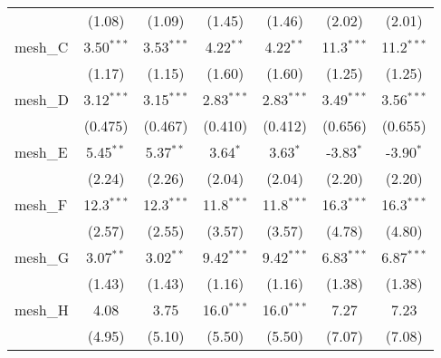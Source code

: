 \begin{tabular}{lcccccc}
                                                               & (1.08)         & (1.09)        & (1.45)        & (1.46)        & (2.02)        & (2.01)\\   
   mesh\_C                                                     & 3.50$^{***}$   & 3.53$^{***}$  & 4.22$^{**}$   & 4.22$^{**}$   & 11.3$^{***}$  & 11.2$^{***}$\\   
                                                               & (1.17)         & (1.15)        & (1.60)        & (1.60)        & (1.25)        & (1.25)\\   
   mesh\_D                                                     & 3.12$^{***}$   & 3.15$^{***}$  & 2.83$^{***}$  & 2.83$^{***}$  & 3.49$^{***}$  & 3.56$^{***}$\\   
                                                               & (0.475)        & (0.467)       & (0.410)       & (0.412)       & (0.656)       & (0.655)\\   
   mesh\_E                                                     & 5.45$^{**}$    & 5.37$^{**}$   & 3.64$^{*}$    & 3.63$^{*}$    & -3.83$^{*}$   & -3.90$^{*}$\\   
                                                               & (2.24)         & (2.26)        & (2.04)        & (2.04)        & (2.20)        & (2.20)\\   
   mesh\_F                                                     & 12.3$^{***}$   & 12.3$^{***}$  & 11.8$^{***}$  & 11.8$^{***}$  & 16.3$^{***}$  & 16.3$^{***}$\\   
                                                               & (2.57)         & (2.55)        & (3.57)        & (3.57)        & (4.78)        & (4.80)\\   
   mesh\_G                                                     & 3.07$^{**}$    & 3.02$^{**}$   & 9.42$^{***}$  & 9.42$^{***}$  & 6.83$^{***}$  & 6.87$^{***}$\\   
                                                               & (1.43)         & (1.43)        & (1.16)        & (1.16)        & (1.38)        & (1.38)\\   
   mesh\_H                                                     & 4.08           & 3.75          & 16.0$^{***}$  & 16.0$^{***}$  & 7.27          & 7.23\\   
                                                               & (4.95)         & (5.10)        & (5.50)        & (5.50)        & (7.07)        & (7.08)\\   

\end{tabular}
